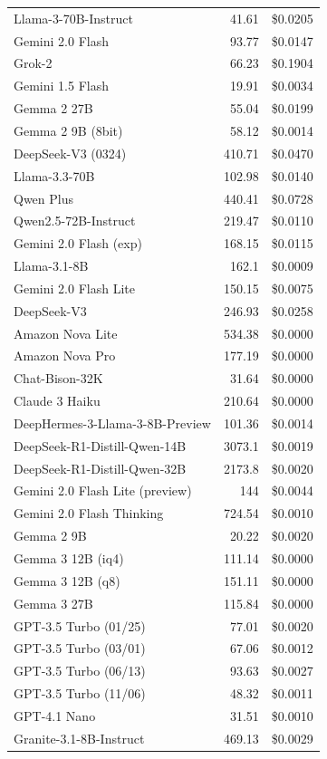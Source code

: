 \documentclass[11pt]{article}
\begin{document}
\begin{table}[htbp]
{\begin{tabular}{lrr}
Llama-3-70B-Instruct & 41.61 & \$0.0205 \\
Gemini 2.0 Flash & 93.77 & \$0.0147 \\
Grok-2 & 66.23 & \$0.1904 \\
Gemini 1.5 Flash & 19.91 & \$0.0034 \\
Gemma 2 27B & 55.04 & \$0.0199 \\
Gemma 2 9B (8bit) & 58.12 & \$0.0014 \\
DeepSeek-V3 (0324) & 410.71 & \$0.0470 \\
Llama-3.3-70B & 102.98 & \$0.0140 \\
Qwen Plus & 440.41 & \$0.0728 \\
Qwen2.5-72B-Instruct & 219.47 & \$0.0110 \\
Gemini 2.0 Flash (exp) & 168.15 & \$0.0115 \\
Llama-3.1-8B & 162.1 & \$0.0009 \\
Gemini 2.0 Flash Lite & 150.15 & \$0.0075 \\
DeepSeek-V3 & 246.93 & \$0.0258 \\
Amazon Nova Lite & 534.38 & \$0.0000 \\
Amazon Nova Pro & 177.19 & \$0.0000 \\
Chat-Bison-32K & 31.64 & \$0.0000 \\
Claude 3 Haiku & 210.64 & \$0.0000 \\
DeepHermes-3-Llama-3-8B-Preview & 101.36 & \$0.0014 \\
DeepSeek-R1-Distill-Qwen-14B & 3073.1 & \$0.0019 \\
DeepSeek-R1-Distill-Qwen-32B & 2173.8 & \$0.0020 \\
Gemini 2.0 Flash Lite (preview) & 144 & \$0.0044 \\
Gemini 2.0 Flash Thinking & 724.54 & \$0.0010 \\
Gemma 2 9B & 20.22 & \$0.0020 \\
Gemma 3 12B (iq4) & 111.14 & \$0.0000 \\
Gemma 3 12B (q8) & 151.11 & \$0.0000 \\
Gemma 3 27B & 115.84 & \$0.0000 \\
GPT-3.5 Turbo (01/25) & 77.01 & \$0.0020 \\
GPT-3.5 Turbo (03/01) & 67.06 & \$0.0012 \\
GPT-3.5 Turbo (06/13) & 93.63 & \$0.0027 \\
GPT-3.5 Turbo (11/06) & 48.32 & \$0.0011 \\
GPT-4.1 Nano & 31.51 & \$0.0010 \\
Granite-3.1-8B-Instruct & 469.13 & \$0.0029 \\

\end{tabular}}
\end{table}
\end{document}
